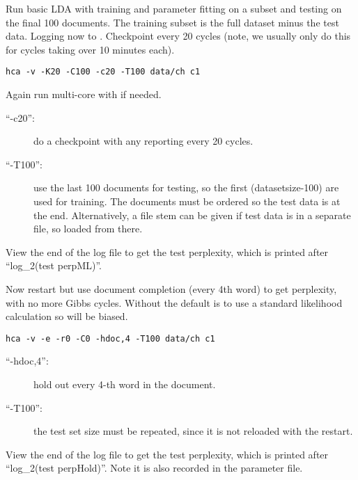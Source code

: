 \documentclass[a4paper,english]{article}
\begin{document}
Run basic LDA with training and parameter fitting on a subset
and testing on the final 100 documents.  
The training subset is the full dataset minus the test data.
Logging now to .
Checkpoint every 20 cycles
(note, we usually only do this for cycles taking over 10 minutes each).
\begin{verbatim}
hca -v -K20 -C100 -c20 -T100 data/ch c1
\end{verbatim}
Again run multi-core with  if needed.
\begin{description}
\item[``-c20'':] do a checkpoint with any reporting every
20 cycles.
\item[``-T100'':] use the last 100 documents for testing,
so the first (datasetsize-100) are used for training.
The documents must be ordered so the test data is at the end.
Alternatively, a file stem can be given if test data is in a 
separate file, so loaded from there.
\end{description}
View the end of the log file to get the test perplexity,
which is printed after ``log\_2(test perpML)''.

Now restart but use document completion (every 4th word) to 
get perplexity, with no more Gibbs cycles.
Without  the default is to use
a standard likelihood calculation so will be biased.
\begin{verbatim}
hca -v -e -r0 -C0 -hdoc,4 -T100 data/ch c1
\end{verbatim}
\begin{description}
\item[``-hdoc,4'':] hold out every 4-th word in
the document.
\item[``-T100'':] the test set size must be repeated, since it is not
reloaded with the restart.
\end{description}
View the end of the log file to get the test perplexity,
which is printed after ``log\_2(test perpHold)''.
Note it is also recorded in the parameter file.
\end{document}
